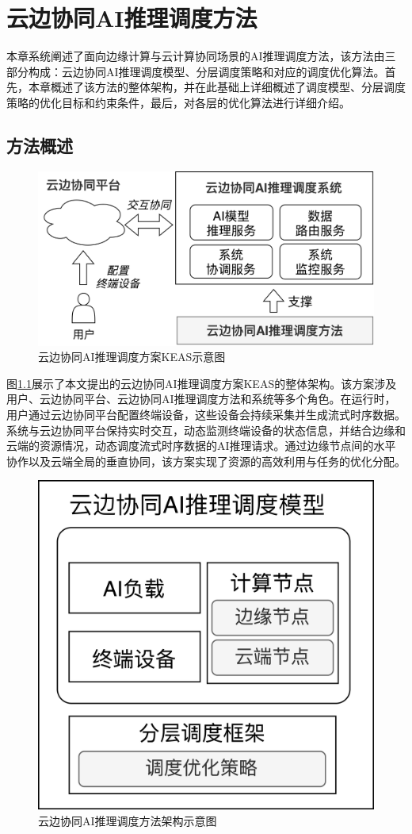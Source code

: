 
\chapter{云边协同AI推理调度方法}

本章系统阐述了面向边缘计算与云计算协同场景的AI推理调度方法，该方法由三部分构成：云边协同AI推理调度模型、分层调度策略和对应的调度优化算法。首先，本章概述了该方法的整体架构，并在此基础上详细概述了调度模型、分层调度策略的优化目标和约束条件，最后，对各层的优化算法进行详细介绍。

\section{方法概述}

\begin{figure}[h]
  \centering
  \includegraphics[width=0.7\linewidth]{pics/3-all.png}
  \caption{云边协同AI推理调度方案KEAS示意图}
  \label{fig:3-all}
\end{figure}

图\ref{fig:3-all}展示了本文提出的云边协同AI推理调度方案KEAS的整体架构。该方案涉及用户、云边协同平台、云边协同AI推理调度方法和系统等多个角色。在运行时，用户通过云边协同平台配置终端设备，这些设备会持续采集并生成流式时序数据。系统与云边协同平台保持实时交互，动态监测终端设备的状态信息，并结合边缘和云端的资源情况，动态调度流式时序数据的AI推理请求。通过边缘节点间的水平协作以及云端全局的垂直协同，该方案实现了资源的高效利用与任务的优化分配。

\begin{figure}[ht]
  \centering
  \includegraphics[width=0.8\linewidth]{pics/3-0架构.png}
  \caption{云边协同AI推理调度方法架构示意图}
  \label{fig:3-0arch}
\end{figure}

